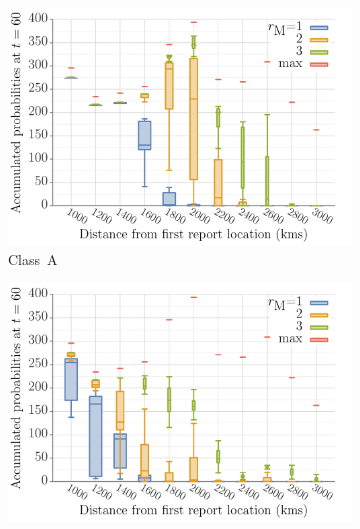 \documentclass[10pt]{article}
\theoremstyle{definition}
\begin{document}
\begin{figure}[htb]
\begin{subfigure}[b]{.47\textwidth}
    \includegraphics[width=\textwidth]{../cellular_automata/results/dist_inf_plots/dist_prob_A_box.pdf}
    \caption{Class~A\label{fig:spreadRateA}}
\end{subfigure}
\begin{subfigure}[b]{.47\textwidth}
    \includegraphics[width=\textwidth]{../cellular_automata/results/dist_inf_plots/dist_prob_B_box.pdf}

\end{subfigure}
\end{figure}
\end{document}
